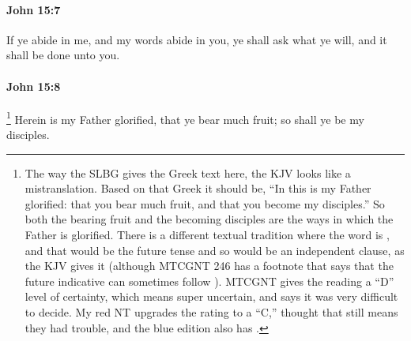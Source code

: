 		\paragraph{John 15:7} %
			\label{JOHN-15-7}

			If ye abide in me, and my words abide in you, ye shall ask what ye will, and it shall be done unto you.

			\begin{framed}
				\scriptsize
				\begin{compactdesc}
					\item[SBLG] 
				\end{compactdesc}
			\end{framed}

		\paragraph{John 15:8} %
			\label{JOHN-15-8}

				\footnote{%
					The way the SLBG gives the Greek text here, the KJV looks like a mistranslation. Based on that Greek it should be, ``In this is my Father glorified: that you bear much fruit, and that you become my disciples.'' So both the bearing fruit and the becoming disciples are the ways in which the Father is glorified. There is a different textual tradition where the word is , and that would be the future tense and so would be an independent clause, as the KJV gives it (although MTCGNT 246 has a footnote that says that the future indicative can sometimes follow ). MTCGNT gives the  reading a ``D'' level of certainty, which means super uncertain, and says it was very difficult to decide. My red NT upgrades the rating to a ``C,'' thought that still means they had trouble, and the blue edition also has . 
					}%
			Herein is my Father glorified, that ye bear much fruit; so shall ye be my disciples.

